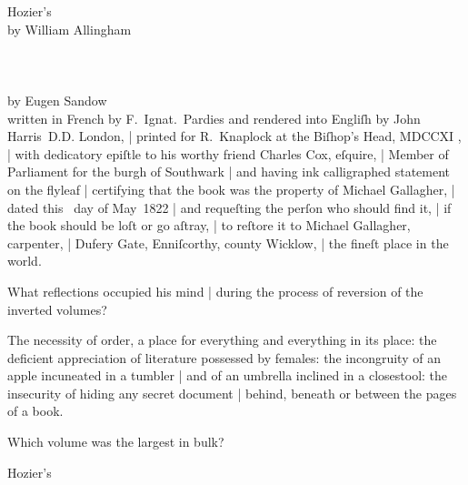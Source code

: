 Hozier's 
\\
 by William Allingham
%
\\
\\
\\
\\
 by Eugen Sandow
\\
written in French by F.~Ignat.\ Pardies
and rendered into Engliſh by John Harris~D.D. London, |
printed for R.~Knaplock at the Biſhop's Head, MDCCXI , |
with dedicatory epiſtle to his worthy friend Charles Cox, eſquire, |
Member of Parliament for the burgh of Southwark |
and having ink calligraphed statement on the flyleaf |
certifying that the book was the property of Michael Gallagher, |
dated this ~day of May~1822 |
and requeſting the perſon who should find it, |
if the book should be loſt or go aſtray, |
to reſtore it to Michael Gallagher, carpenter, |
Dufery Gate, Enniſcorthy, county Wicklow, |
the fineſt place in the world.



What reflections occupied his mind |
during the process of reversion of the inverted volumes?

\Philosophy
The necessity of order,
a place for everything and everything in its place:
the deficient appreciation of literature possessed by females:
the incongruity of an apple incuneated in a tumbler |
and of an umbrella inclined in a closestool:
the insecurity of hiding any secret document |
behind, beneath or between the pages of a book.


Which volume was the largest in bulk?

\Factual
Hozier's 


